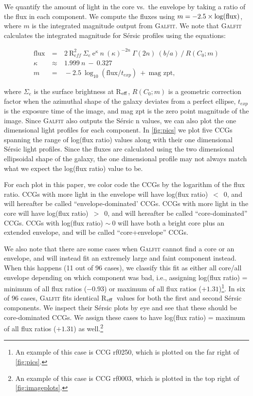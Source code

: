 \documentclass[iop,apj]{emulateapj}
\newcommand{\Reff}{R$_{\rm eff}$}
\begin{document}
We quantify the amount of light in the core vs.~the envelope by taking a ratio of the flux in each component. We compute the fluxes using $m = -2.5 \times \log({\rm flux})$, where $m$ is the integrated magnitude output from \textsc{Galfit}. We note that \textsc{Galfit} calculates the integrated magnitude for S\'ersic profiles using the equations:

\begin{eqnarray}
\text{flux}~&=&~2~\text{R}_{eff}^2~\Sigma_e~\text{e}^{\kappa}~n~(\kappa)^{-2n}~\Gamma(2n)~(b/a)~/~R(C_0; m) \\
\kappa~&\approx&~1.999~n~-~0.327\\
m~&=&~-2.5~\log_{10}(\text{flux}/t_{exp})~+~\text{mag zpt},
\end{eqnarray}

where $\Sigma_e$ is the surface brightness at \Reff, $R(C_0; m)$ is a geometric correction factor when the azimuthal shape of the galaxy deviates from a perfect ellipse, $t_{exp}$ is the exposure time of the image, and mag zpt is the zero point magnitude of the image. Since \textsc{Galfit} also outputs the S\'ersic n values, we can also plot the one dimensional light profiles for each component. In \autoref{fig:pics} we plot five CCGs spanning the range of log(flux ratio) values along with their one dimensional S\'ersic light profiles. Since the fluxes are calculated using the two dimensional ellipsoidal shape of the galaxy, the one dimensional profile may not always match what we expect the log(flux ratio) value to be.

For each plot in this paper, we color code the CCGs by the logarithm of the flux ratio. CCGs with more light in the envelope will have log(flux ratio)~$<$~0, and will hereafter be called ``envelope-dominated' CCGs. CCGs with more light in the core will have log(flux ratio)~$>$~0, and will hereafter be called ``core-dominated'' CCGs. CCGs with log(flux ratio) $\sim~0$ will have both a bright core plus an extended envelope, and will be called ``core+envelope'' CCGs.

We also note that there are some cases when \textsc{Galfit} cannot find a core or an envelope, and will instead fit an extremely large and faint component instead. When this happens (11 out of 96 cases), we classify this fit as either all core/all envelope depending on which component was bad, i.e., assigning log(flux ratio) = minimum of all flux ratios ($-0.93$) or maximum of all flux ratios ($+1.31$)\footnote{An example of this case is CCG rf0250, which is plotted on the far right of \autoref{fig:pics}.}. In six of 96 cases, \textsc{Galfit} fits identical \Reff\ values for both the first and second S\'ersic components. We inspect their S\'ersic plots by eye and see that these should be core-dominated CCGs. We assign these cases to have log(flux ratio) = maximum of all flux ratios ($+1.31$) as well.\footnote{An example of this case is CCG rf0003, which is plotted in the top right of \autoref{fig:imageplots}.}
\end{document}
